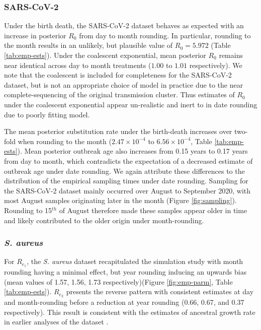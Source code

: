 \documentclass[11pt]{article}
\begin{document}
\begin{spacing}{1.5}
\subsubsection*{SARS-CoV-2}
Under the birth death, the SARS-CoV-2 dataset behaves as expected with an increase in posterior $R_0$ from day to month rounding. In particular, rounding to the month results in an unlikely, but plausible value of $R_0 = 5.972$ (Table \ref{tab:emp-ests}). Under the coalescent exponential, mean posterior $R_0$ remains near identical across day to month treatments ($1.00$ to $1.01$ respectively). We note that the coalescent is included for completeness for the SARS-CoV-2 dataset, but is not an appropriate choice of model in practice due to the near complete-sequencing of the original transmission cluster. Thus estimates of $R_0$ under the coalescent exponential appear un-realistic and inert to in date rounding due to poorly fitting model.

The mean posterior substitution rate under the birth-death increases over two-fold when rounding to the month ($2.47\times10^{-4}$ to $6.56\times10^{-4}$, Table \ref{tab:emp-ests}). Mean posterior outbreak age also increases from 0.15 years to 0.17 years from day to month, which contradicts the expectation of a decreased estimate of outbreak age under date rounding. We again attribute these differences to the distribution of the empirical sampling times under date rounding. Sampling for the SARS-CoV-2 dataset mainly occurred over August to September 2020, with most August samples originating later in the month (Figure \ref{fig:sampling}). Rounding to 15$^{th}$ of August therefore made these samples appear older in time and likely contributed to the older origin under month-rounding.

\subsubsection*{\textit{S. aureus}}
For $R_{e_1}$, the \textit{S. aureus} dataset recapitulated the simulation study with month rounding having a minimal effect, but year rounding inducing an upwards bias (mean values of 1.57, 1.56, 1.73 respectively)(Figure \ref{fig:emp-parm}, Table \ref{tab:emp-ests}). $R_{e_2}$ presents the reverse pattern with consistent estimates at day and month-rounding before a reduction at year rounding (0.66, 0.67, and 0.37 respectively). This result is consistent with the estimates of ancestral growth rate in earlier analyses of the dataset \cite{volz_modeling_2018}.


\end{spacing}
\end{document}
